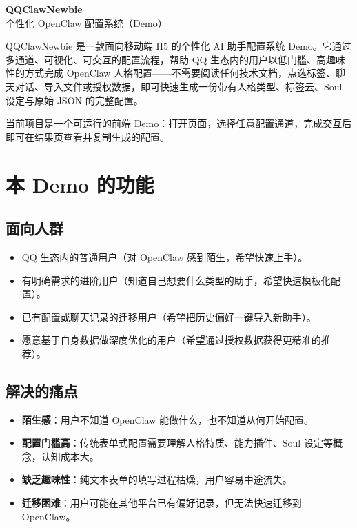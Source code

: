 \documentclass[11pt,a4paper]{ctexart}
\begin{document}
\begin{center}
\vspace*{1em}
{\LARGE\bfseries QQClawNewbie}\\[0.6em]
{\Large 个性化 OpenClaw 配置系统（Demo）}\\[1.5em]
\end{center}

\noindent
QQClawNewbie 是一款面向移动端 H5 的个性化 AI 助手配置系统 Demo。它通过多通道、可视化、可交互的配置流程，帮助 QQ 生态内的用户以低门槛、高趣味性的方式完成 OpenClaw 人格配置——不需要阅读任何技术文档，点选标签、聊天对话、导入文件或授权数据，即可快速生成一份带有人格类型、标签云、Soul 设定与原始 JSON 的完整配置。

当前项目是一个可运行的前端 Demo：打开页面，选择任意配置通道，完成交互后即可在结果页查看并复制生成的配置。

\vspace{1em}

\section{本 Demo 的功能}

\subsection{面向人群}

\begin{itemize}
  \item QQ 生态内的普通用户（对 OpenClaw 感到陌生，希望快速上手）。
  \item 有明确需求的进阶用户（知道自己想要什么类型的助手，希望快速模板化配置）。
  \item 已有配置或聊天记录的迁移用户（希望把历史偏好一键导入新助手）。
  \item 愿意基于自身数据做深度优化的用户（希望通过授权数据获得更精准的推荐）。
\end{itemize}

\subsection{解决的痛点}

\begin{itemize}
  \item \textbf{陌生感}：用户不知道 OpenClaw 能做什么，也不知道从何开始配置。
  \item \textbf{配置门槛高}：传统表单式配置需要理解人格特质、能力插件、Soul 设定等概念，认知成本大。
  \item \textbf{缺乏趣味性}：纯文本表单的填写过程枯燥，用户容易中途流失。
  \item \textbf{迁移困难}：用户可能在其他平台已有偏好记录，但无法快速迁移到 OpenClaw。
\end{itemize}
\end{document}
